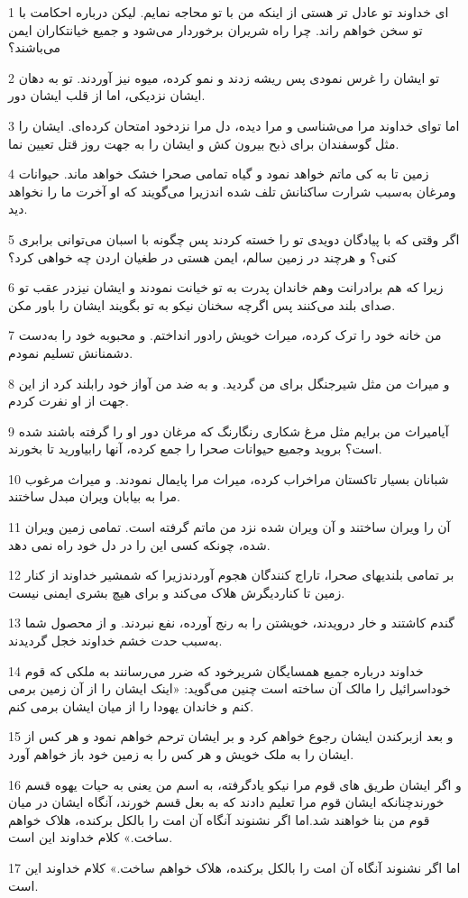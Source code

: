 \par 1 ای خداوند تو عادل تر هستی از اینکه من با تو محاجه نمایم. لیکن درباره احکامت با تو سخن خواهم راند. چرا راه شریران برخوردار می‌شود و جمیع خیانتکاران ایمن می‌باشند؟
\par 2 تو ایشان را غرس نمودی پس ریشه زدند و نمو کرده، میوه نیز آوردند. تو به دهان ایشان نزدیکی، اما از قلب ایشان دور.
\par 3 اما تو‌ای خداوند مرا می‌شناسی و مرا دیده، دل مرا نزدخود امتحان کرده‌ای. ایشان را مثل گوسفندان برای ذبح بیرون کش و ایشان را به جهت روز قتل تعیین نما.
\par 4 زمین تا به کی ماتم خواهد نمود و گیاه تمامی صحرا خشک خواهد ماند. حیوانات ومرغان به‌سبب شرارت ساکنانش تلف شده اندزیرا می‌گویند که او آخرت ما را نخواهد دید.
\par 5 اگر وقتی که با پیادگان دویدی تو را خسته کردند پس چگونه با اسبان می‌توانی برابری کنی؟ و هر‌چند در زمین سالم، ایمن هستی در طغیان اردن چه خواهی کرد؟
\par 6 زیرا که هم برادرانت وهم خاندان پدرت به تو خیانت نمودند و ایشان نیزدر عقب تو صدای بلند می‌کنند پس اگر‌چه سخنان نیکو به تو بگویند ایشان را باور مکن.
\par 7 من خانه خود را ترک کرده، میراث خویش رادور انداختم. و محبوبه خود را به‌دست دشمنانش تسلیم نمودم.
\par 8 و میراث من مثل شیرجنگل برای من گردید. و به ضد من آواز خود رابلند کرد از این جهت از او نفرت کردم.
\par 9 آیامیراث من برایم مثل مرغ شکاری رنگارنگ که مرغان دور او را گرفته باشند شده است؟ بروید وجمیع حیوانات صحرا را جمع کرده، آنها رابیاورید تا بخورند.
\par 10 شبانان بسیار تاکستان مراخراب کرده، میراث مرا پایمال نمودند. و میراث مرغوب مرا به بیابان ویران مبدل ساختند.
\par 11 آن را ویران ساختند و آن ویران شده نزد من ماتم گرفته است. تمامی زمین ویران شده، چونکه کسی این را در دل خود راه نمی دهد.
\par 12 بر تمامی بلندیهای صحرا، تاراج کنندگان هجوم آوردندزیرا که شمشیر خداوند از کنار زمین تا کناردیگرش هلاک می‌کند و برای هیچ بشری ایمنی نیست.
\par 13 گندم کاشتند و خار درویدند، خویشتن را به رنج آورده، نفع نبردند. و از محصول شما به‌سبب حدت خشم خداوند خجل گردیدند.
\par 14 خداوند درباره جمیع همسایگان شریرخود که ضرر می‌رسانند به ملکی که قوم خوداسرائیل را مالک آن ساخته است چنین می‌گوید: «اینک ایشان را از آن زمین برمی کنم و خاندان یهودا را از میان ایشان برمی کنم.
\par 15 و بعد ازبرکندن ایشان رجوع خواهم کرد و بر ایشان ترحم خواهم نمود و هر کس از ایشان را به ملک خویش و هر کس را به زمین خود باز خواهم آورد.
\par 16 و اگر ایشان طریق های قوم مرا نیکو یادگرفته، به اسم من یعنی به حیات یهوه قسم خورندچنانکه ایشان قوم مرا تعلیم دادند که به بعل قسم خورند، آنگاه ایشان در میان قوم من بنا خواهند شد.اما اگر نشنوند آنگاه آن امت را بالکل برکنده، هلاک خواهم ساخت.» کلام خداوند این است.
\par 17 اما اگر نشنوند آنگاه آن امت را بالکل برکنده، هلاک خواهم ساخت.» کلام خداوند این است.
 
